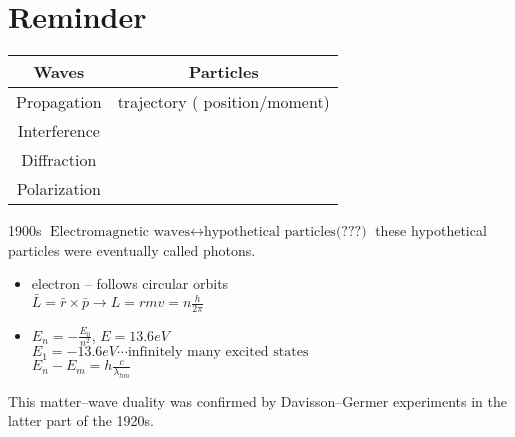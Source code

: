 
\chapter{Reminder}

\begin{center}
\begin{tabular}{|c|c|}

\hline
Waves & Particles \\
\hline
Propagation  & trajectory ( position/moment)\\
\hline
Interference & \\
\hline
Diffraction & \\
\hline
Polarization & \\
\hline
\end{tabular}
\end{center}

1900s
$\text{Electromagnetic waves} \leftrightarrow \text{hypothetical particles(???)}$ these hypothetical particles were eventually called photons.

{
    \begin{itemize}
        \item electron -- follows circular orbits\\
        $\bar{L} = \bar{r}\times \bar{p} \rightarrow L = r m v = n \frac{h}{2\pi}$
            \item $E_n = -\frac{E_0}{n^2}$, $E=13.6\unit{eV}$ \\
                $E_1 = -13.6\unit{eV}\cdots \text{infinitely many excited states}$ \\
                $E_n - E_m = h \frac{c}{\lambda_{hm}}$

    \end{itemize}
}

This matter--wave duality was confirmed by Davisson--Germer experiments
in the latter part of the 1920s.


